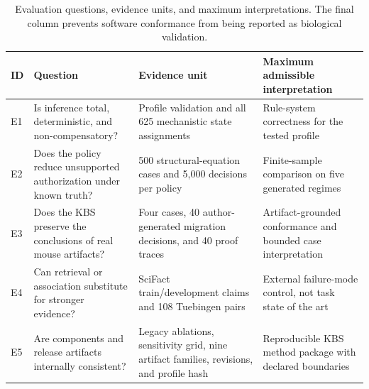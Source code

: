 \begin{table}[t!]
\centering
\caption{Evaluation questions, evidence units, and maximum interpretations. The final column prevents software conformance from being reported as biological validation.}
\label{tab:experiment-design}
\footnotesize
\renewcommand{\arraystretch}{1.12}
\begin{tabularx}{\textwidth}{@{}p{}p{}p{}Y@{}}
\toprule
ID & Question & Evidence unit & Maximum admissible interpretation \\
\midrule
E1 & Is inference total, deterministic, and non-compensatory? & Profile validation and all 625 mechanistic state assignments & Rule-system correctness for the tested profile \\
\addlinespace[2pt]
E2 & Does the policy reduce unsupported authorization under known truth? & 500 structural-equation cases and 5,000 decisions per policy & Finite-sample comparison on five generated regimes \\
\addlinespace[2pt]
E3 & Does the KBS preserve the conclusions of real mouse artifacts? & Four cases, 40 author-generated migration decisions, and 40 proof traces & Artifact-grounded conformance and bounded case interpretation \\
\addlinespace[2pt]
E4 & Can retrieval or association substitute for stronger evidence? & SciFact train/development claims and 108 Tuebingen pairs & External failure-mode control, not task state of the art \\
\addlinespace[2pt]
E5 & Are components and release artifacts internally consistent? & Legacy ablations, sensitivity grid, nine artifact families, revisions, and profile hash & Reproducible KBS method package with declared boundaries \\
\bottomrule
\end{tabularx}
\end{table}
